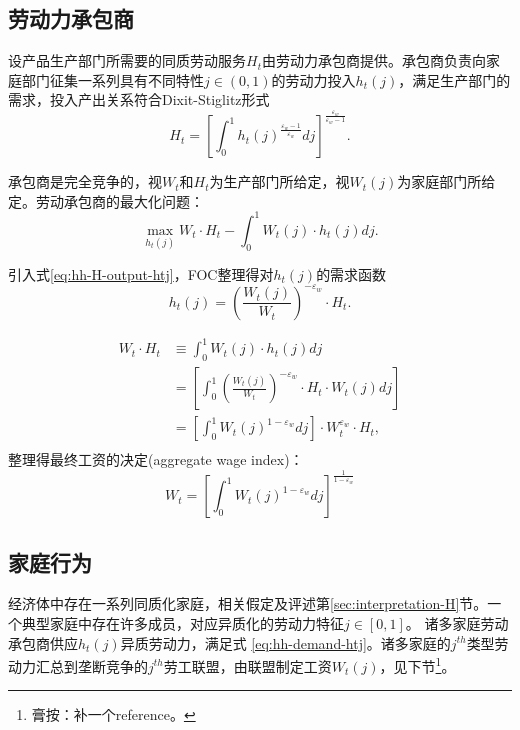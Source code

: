 \subsection{劳动力承包商}
\label{sec:hh-labor-contractors}
设产品生产部门所需要的同质劳动服务$H_t$由劳动力承包商提供。承包商负责向家庭部门征集一系列具有不同特性$j\in(0,1)$的劳动力投入$h_{t}(j)$，满足生产部门的需求，投入产出关系符合Dixit-Stiglitz形式\citep{Dixit:1977tv}
\begin{equation}
  \label{eq:hh-H-output-htj}
  H_t = \left[ \int_{0}^{1} h_t(j)^{\frac{\varepsilon_w -1}{\varepsilon_w}} dj\right]^{\frac{\varepsilon_w }{\varepsilon_w -1}}.
\end{equation}

承包商是完全竞争的，视$W_t$和$H_t$为生产部门所给定，视$W_t(j)$为家庭部门所给定。劳动承包商的最大化问题：
\begin{equation*}
  \max_{h_t(j)} W_t \cdot H_t - \int_{0}^{1} W_t(j) \cdot h_t(j) dj.
\end{equation*}

引入式\eqref{eq:hh-H-output-htj}，FOC整理得对$h_t(j)$的需求函数
\begin{equation}
  \label{eq:hh-demand-htj}
  h_t(j) = \left( \frac{W_t(j)}{W_t}\right)^{-\varepsilon_w} \cdot H_t.
\end{equation}

\begin{equation*}
  \begin{split}
    W_t \cdot H_t & \equiv \int_0^1 W_t(j) \cdot h_t(j) dj \\
    &=\left[\int_0^1 \left(\frac{W_t(j)}{W_t}\right)^{-\varepsilon_w} \cdot H_t \cdot W_t(j) dj \right] \\
    &=\left[\int_0^1 W_t(j)^{1-\varepsilon_w} dj \right] \cdot W_t^{\varepsilon_w} \cdot H_t,\\
  \end{split}
\end{equation*}
整理得最终工资的决定(aggregate wage index)：
\begin{equation}
  \label{eq:agg-wage-index}
  W_t = \left[
    \int_0^1 W_t(j)^{1-\varepsilon_w} dj
  \right]^{\frac{1}{1-\varepsilon_w}}
\end{equation}

\subsection{家庭行为}
\label{sec:hh-behav}
经济体中存在一系列同质化家庭，相关假定及评述第\ref{sec:interpretation-H}节。一个典型家庭中存在许多成员，对应异质化的劳动力特征$j \in [0,1]$。
诸多家庭劳动承包商供应$h_t(j)$异质劳动力，满足式  \eqref{eq:hh-demand-htj}。诸多家庭的$j^{th}$类型劳动力汇总到垄断竞争的$j^{th}$劳工联盟，由联盟制定工资$W_t(j)$，见下节\footnote{膏按：补一个reference。}。

